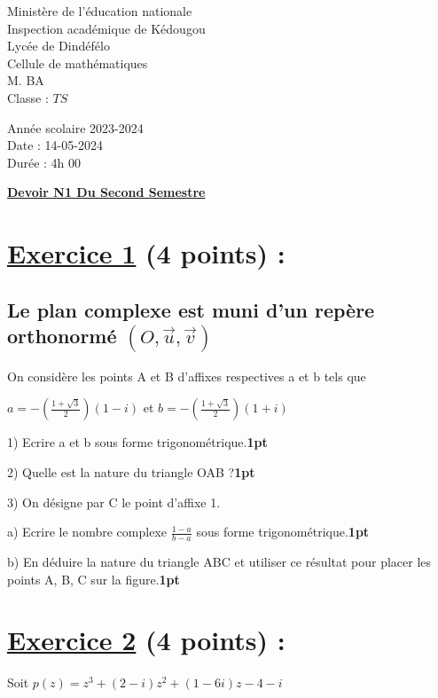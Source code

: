 \documentclass{article}
\begin{document}
\begin{minipage}{0.5\textwidth}
	Ministère de l'éducation nationale  \\
	Inspection académique de Kédougou   \\
	Lycée de Dindéfélo            \\
	Cellule de mathématiques            \\
	M. BA                          \\
	Classe : $TS$  \\
\end{minipage}
\begin{minipage}{0.5\textwidth}
	Année scolaire 2023-2024 \\
	Date : 14-05-2024 \\
	Durée : 4h 00 \\
\end{minipage}

\begin{center}
	\textbf{{\underline{Devoir N1 Du Second Semestre}}}
\end{center}

\section*{\underline{Exercice 1} (4 points) :}
\subsection*{Le plan complexe est muni d’un repère orthonormé $(O,\vec{u},\vec{v})$}
On considère les points A et B d’affixes respectives a et b tels que

$a=-(\frac{1+\sqrt{3}}{2})(1-i)$ et $b=-(\frac{1+\sqrt{3}}{2})(1+i)$ 

1) Ecrire a et b sous forme trigonométrique.\textbf{1pt}

2) Quelle est la nature du triangle OAB ?\textbf{1pt}

3) On désigne par C le point d’affixe 1.

a) Ecrire le nombre complexe $\frac{1-a}{b-a}$  sous forme trigonométrique.\textbf{1pt}

b) En déduire la nature du triangle ABC et  utiliser ce résultat pour placer les points A, B, C sur la figure.\textbf{1pt}
\section*{\underline{Exercice 2} (4 points) :}
Soit $p(z)=z^{3}+(2-i)z^{2}+(1-6i)z-4-i$
\end{document}
